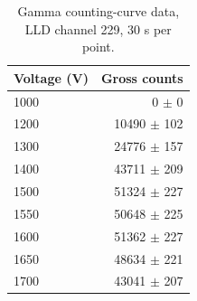 \begin{table}[htbp]
\centering
\caption{Gamma counting-curve data, LLD channel 229, 30 s per point.}
\label{tab:gamma-raw}
\begin{tabular}{lr}
\toprule
Voltage (V) & Gross counts \\
\midrule
1000 & 0 $\pm$ 0 \\
1200 & 10490 $\pm$ 102 \\
1300 & 24776 $\pm$ 157 \\
1400 & 43711 $\pm$ 209 \\
1500 & 51324 $\pm$ 227 \\
1550 & 50648 $\pm$ 225 \\
1600 & 51362 $\pm$ 227 \\
1650 & 48634 $\pm$ 221 \\
1700 & 43041 $\pm$ 207 \\
\bottomrule
\end{tabular}
\end{table}
